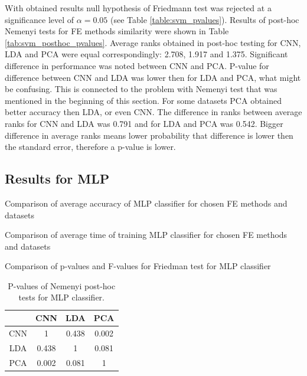 \documentclass[a4paper, 10 pt, journal]{ieeeconf}
\begin{document}
\newpage

With obtained results null hypothesis of Friedmann test was rejected at a significance level of $\alpha = 0.05$ (see Table \ref{table:svm_pvalues}). 
Results of post-hoc Nemenyi tests for FE methods similarity were shown in Table \ref{tab:svm_posthoc_pvalues}. 
Average ranks obtained in post-hoc testing for CNN, LDA and PCA were equal correspondingly: 2.708, 1.917 and 1.375.
Significant difference in performance was noted between CNN and PCA.
P-value for difference between CNN and LDA was lower then for LDA and PCA, what might be confusing. This is connected to the problem with Nemenyi test that was mentioned in the beginning of this section. For some datasets PCA obtained better accuracy then LDA, or even CNN. The difference in ranks between average ranks for CNN and LDA was 0.791 and for LDA and PCA was 0.542. Bigger difference in average ranks means lower probability that difference is lower then the standard error, therefore a p-value is lower. 

\newpage

\subsection{Results for MLP}


\begin{table}[!h]
    \centering
    \caption{Comparison of average accuracy of MLP classifier for chosen FE methods and datasets}
    
    \label{table:NN_acc_comparison}
\end{table}

\begin{table}[!h]
    \centering
    \caption{Comparison of average time of training MLP classifier for chosen FE methods and datasets}
    
    \label{table:NN_fit_time_comparison}
\end{table}

\begin{table}[!h]
    \centering
    \caption{Comparison of p-values and F-values for Friedman test for MLP classifier}
    
    \label{table:NN_pvalues}
\end{table}

\begin{table}[!h]
    \centering
    \caption{P-values of Nemenyi post-hoc tests for MLP classifier.}
    \begin{tabular}{|c|c|c|c|}
         \hline
          \rowcolor{Gray}
          & CNN & LDA & PCA \\
         \hline
         CNN &  1 &  0.438 &  0.002 \\
         \hline
         LDA &  0.438 & 1 &  0.081 \\
         \hline
         PCA &  0.002 & 0.081 & 1 \\
         \hline
    \end{tabular}
    \label{tab:NN_posthoc_pvalues}
\end{table}
\end{document}
